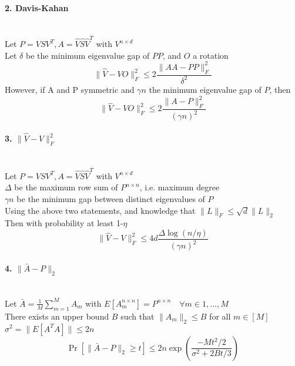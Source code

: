 \documentclass[10pt]{article}
\begin{document}
\paragraph{2. Davis-Kahan}\mbox{}\\
Let $P = VSV^T, A = \hat{V}\hat{S}\hat{V}^T$ with $V^{n\times d} $\\
Let $\delta$ be the minimum eigenvalue gap of $PP$, and $O$ a rotation
\begin{equation}
\| \hat{V}-VO\|_{F}^2 \leq 2\frac{\| AA-PP\|_{F}^2}{\delta^2}
\end{equation}
However, if A and P symmetric and $\gamma n$ the minimum eigenvalue gap of $P$, then
\begin{equation}
\| \hat{V}-VO\|_{F}^2 \leq 2\frac{\| A-P\|_{F}^2}{(\gamma n)^2}
\end{equation}

\paragraph{3. $\| \hat{V}-V\|_{F}^2$}\mbox{}\\
Let $P = VSV^T, A = \hat{V}\hat{S}\hat{V}^T$ with $V^{n\times d} $\\
$\Delta$ be the maximum row sum of $P^{n\times n}$, i.e. maximum degree\\
$\gamma n$ be the minimum gap between distinct eigenvalues of $P$\\ 
Using the above two statements, and knowledge that  $\| L \|_F \leq \sqrt{d} \| L \|_{2}$\\
Then with probability at least 1-$\eta$
\begin{equation}
\| \hat{V}-V\|_{F}^2 \leq 4d\frac{\Delta \log(n/\eta)}{(\gamma n)^2}
\end{equation}

\paragraph{4. $\| \bar{A}-P\|_{2}$}\mbox{}\\
Let $\bar{A} = \frac{1}{M}\sum_{m=1}^{M} A_m$ with $E[A_m^{n\times n}] = P^{n\times n} \quad \forall m \in 1,...,M$\\
There exists an upper bound $B$ such that $\| A_m \|_2 \leq B$ for all $m\in [M]$\\
$\sigma ^2 = \| E[A^TA]\| \leq 2n$\\
\begin{equation}
\Pr[\| \bar{A}-P\|_2 \geq t] \leq 2n\exp(\frac{-Mt^2/2}{\sigma^2 + 2Bt/3})
\end{equation}
\end{document}
